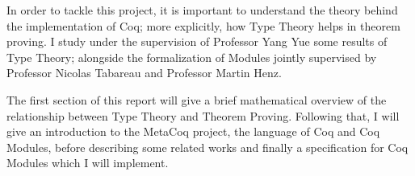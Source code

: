 In order to tackle this project, it is important to understand the theory behind
the implementation of Coq; more explicitly, how Type Theory helps in theorem 
proving. I study under the supervision of Professor Yang Yue some results of
Type Theory; alongside the formalization of Modules jointly supervised by
Professor Nicolas Tabareau and Professor Martin Henz.

The first section of this report will give a brief mathematical overview of the
relationship between Type Theory and Theorem Proving. Following that, I
will give an introduction to the MetaCoq project, the language of Coq and
Coq Modules, before describing some related works and finally a
specification for Coq Modules which I will implement.